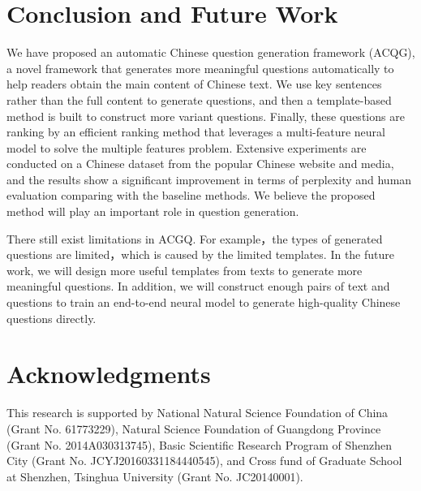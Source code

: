 \documentclass[runningheads,UTF8,article]{comsis2}
\newcommand\revised[1]{{\color{black} #1}}
\begin{document}
	\section{Conclusion and Future Work}
	We have proposed an automatic Chinese question generation framework (ACQG), a novel framework that generates more meaningful questions automatically to help readers obtain the main content of Chinese text. We use key sentences rather than the full content to generate questions, and then a template-based method is built to construct more variant questions. Finally, these questions are ranking by an efficient ranking method that leverages a multi-feature neural model to solve the multiple features problem. Extensive experiments are conducted on a Chinese dataset from the popular Chinese website and media, and the results show a significant improvement in terms of perplexity and human evaluation comparing with the baseline methods. We believe the proposed method will play an important role in question generation. 
	
	\revised{
		There  still exist limitations in ACGQ. For example，the types of generated questions are limited，which is caused by the limited templates.
		In the future work, we will design more useful templates from texts to generate more meaningful questions. In addition, we will construct enough pairs of text and questions to train an end-to-end neural model to generate high-quality Chinese questions directly.}
	
	
	\section{Acknowledgments}
	
	
	This research is supported by National Natural Science Foundation of China (Grant No. 61773229), Natural Science Foundation of Guangdong Province (Grant No. 2014A030313745), Basic Scientific Research Program of Shenzhen City (Grant No. JCYJ20160331184440545), and Cross fund of Graduate School at Shenzhen, Tsinghua University (Grant No. JC20140001).
	
	
	
	
	


	
	
\end{document}
